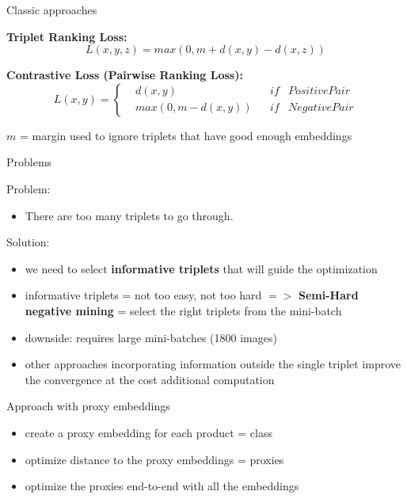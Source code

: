 \documentclass{beamer}
\begin{document}
\begin{frame}{Classic approaches}

\textbf{Triplet Ranking Loss:}
$$
L(x,y,z) = max(0,m + d(x,y) - d(x,z))
$$ \cite{cit:blog}

\vfill

\textbf{Contrastive Loss (Pairwise Ranking Loss):}
$$
L(x, y) = \left\{\begin{matrix} & d(x,y) & & if & PositivePair \\ & max(0, m - d(x,y)) & & if & NegativePair \end{matrix}\right.
$$ \cite{cit:blog}

$m$ = margin used to ignore triplets that have good enough embeddings
\end{frame}

\begin{frame}{Problems}

Problem: 
\begin{itemize}
\item There are too many triplets to go through.
\end{itemize}

\vfill

Solution:
\begin{itemize}
\item we need to select \textbf{informative triplets} that will guide the optimization
\item informative triplets = not too easy, not too hard $=>$ \textbf{Semi-Hard negative mining} = select the right triplets from the mini-batch \cite{cit:semi-hard}
\item downside: requires large mini-batches (1800 images)
\item other approaches incorporating information outside the single triplet improve the convergence at the cost additional computation 
\end{itemize}

\end{frame}

\begin{frame}{Approach with proxy embeddings}

\begin{itemize}
\item create a proxy embedding for each product = class
\item optimize distance to the proxy embeddings = proxies
\item optimize the proxies end-to-end with all the embeddings \cite{cit:metric}
\end{itemize}

\end{frame}
\end{document}
